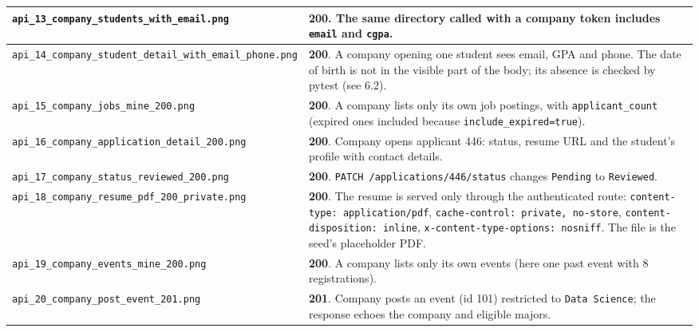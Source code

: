\documentclass[11pt,letterpaper]{article}
\newcommand{\code}[1]{\texttt{#1}}
\begin{document}
{\begin{longtable}{>{\raggedright\arraybackslash}p{}>{\raggedright\arraybackslash}p{}}
\code{api\_\allowbreak{}13\_\allowbreak{}company\_\allowbreak{}students\_\allowbreak{}with\_\allowbreak{}email.\allowbreak{}png} & \textbf{200}. The same directory called with a company token includes \code{email} and \code{cgpa}. \\ \hline
\code{api\_\allowbreak{}14\_\allowbreak{}company\_\allowbreak{}student\_\allowbreak{}detail\_\allowbreak{}with\_\allowbreak{}email\_\allowbreak{}phone.\allowbreak{}png} & \textbf{200}. A company opening one student sees email, GPA and phone. The date of birth is not in the visible part of the body; its absence is checked by pytest (see 6.2). \\ \hline
\code{api\_\allowbreak{}15\_\allowbreak{}company\_\allowbreak{}jobs\_\allowbreak{}mine\_\allowbreak{}200.\allowbreak{}png} & \textbf{200}. A company lists only its own job postings, with \code{applicant\_\allowbreak{}count} (expired ones included because \code{include\_\allowbreak{}expired=\allowbreak{}true}). \\ \hline
\code{api\_\allowbreak{}16\_\allowbreak{}company\_\allowbreak{}application\_\allowbreak{}detail\_\allowbreak{}200.\allowbreak{}png} & \textbf{200}. Company opens applicant 446: status, resume URL and the student's profile with contact details. \\ \hline
\code{api\_\allowbreak{}17\_\allowbreak{}company\_\allowbreak{}status\_\allowbreak{}reviewed\_\allowbreak{}200.\allowbreak{}png} & \textbf{200}. \code{PATCH /\allowbreak{}applications/\allowbreak{}446/\allowbreak{}status} changes \code{Pending} to \code{Reviewed}. \\ \hline
\code{api\_\allowbreak{}18\_\allowbreak{}company\_\allowbreak{}resume\_\allowbreak{}pdf\_\allowbreak{}200\_\allowbreak{}private.\allowbreak{}png} & \textbf{200}. The resume is served only through the authenticated route: \code{content-\allowbreak{}type:\allowbreak{} application/\allowbreak{}pdf}, \code{cache-\allowbreak{}control:\allowbreak{} private,\allowbreak{} no-\allowbreak{}store}, \code{content-\allowbreak{}disposition:\allowbreak{} inline}, \code{x-\allowbreak{}content-\allowbreak{}type-\allowbreak{}options:\allowbreak{} nosniff}. The file is the seed's placeholder PDF. \\ \hline
\code{api\_\allowbreak{}19\_\allowbreak{}company\_\allowbreak{}events\_\allowbreak{}mine\_\allowbreak{}200.\allowbreak{}png} & \textbf{200}. A company lists only its own events (here one past event with 8 registrations). \\ \hline
\code{api\_\allowbreak{}20\_\allowbreak{}company\_\allowbreak{}post\_\allowbreak{}event\_\allowbreak{}201.\allowbreak{}png} & \textbf{201}. Company posts an event (id 101) restricted to \code{Data Science}; the response echoes the company and eligible majors. \\ \hline
\end{longtable}
}
\end{document}
